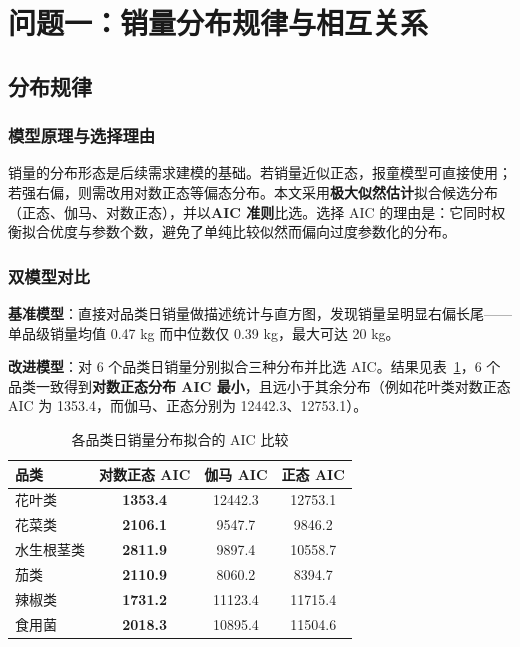 \documentclass[12pt]{ctexart}
\begin{document}
\section{问题一：销量分布规律与相互关系}

\subsection{分布规律}

\subsubsection{模型原理与选择理由}
销量的分布形态是后续需求建模的基础。若销量近似正态，报童模型可直接使用；若强右偏，则需改用对数正态等偏态分布。本文采用\textbf{极大似然估计}拟合候选分布（正态、伽马、对数正态），并以\textbf{AIC 准则}比选。选择 AIC 的理由是：它同时权衡拟合优度与参数个数，避免了单纯比较似然而偏向过度参数化的分布。

\subsubsection{双模型对比}
\textbf{基准模型}：直接对品类日销量做描述统计与直方图，发现销量呈明显右偏长尾——单品级销量均值 0.47 kg 而中位数仅 0.39 kg，最大可达 20 kg。

\textbf{改进模型}：对 6 个品类日销量分别拟合三种分布并比选 AIC。结果见表~\ref{tab:dist}，6 个品类一致得到\textbf{对数正态分布 AIC 最小}，且远小于其余分布（例如花叶类对数正态 AIC 为 1353.4，而伽马、正态分别为 12442.3、12753.1）。

\begin{table}[htbp]
\centering
\caption{各品类日销量分布拟合的 AIC 比较}
\label{tab:dist}
\begin{tabular}{lccc}
\toprule
品类 & 对数正态 AIC & 伽马 AIC & 正态 AIC \\
\midrule
花叶类 & \textbf{1353.4} & 12442.3 & 12753.1 \\
花菜类 & \textbf{2106.1} & 9547.7 & 9846.2 \\
水生根茎类 & \textbf{2811.9} & 9897.4 & 10558.7 \\
茄类 & \textbf{2110.9} & 8060.2 & 8394.7 \\
辣椒类 & \textbf{1731.2} & 11123.4 & 11715.4 \\
食用菌 & \textbf{2018.3} & 10895.4 & 11504.6 \\
\bottomrule
\end{tabular}
\end{table}
\end{document}
